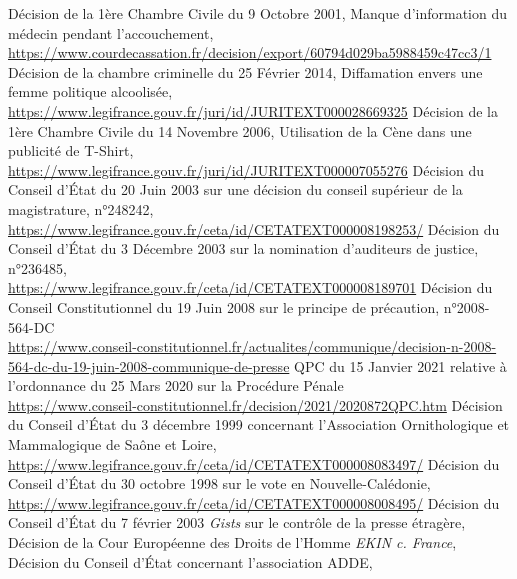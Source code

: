 \documentclass[math]{cours}
\begin{document}
\begin{thebibliography}{255}
	Décision de la 1ère Chambre Civile du 9 Octobre 2001, Manque d'information du médecin pendant l'accouchement,\\
	\url{https://www.courdecassation.fr/decision/export/60794d029ba5988459c47cc3/1}
	Décision de la chambre criminelle du 25 Février 2014, Diffamation envers une femme politique alcoolisée,\\
	\url{https://www.legifrance.gouv.fr/juri/id/JURITEXT000028669325}
	Décision de la 1ère Chambre Civile du 14 Novembre 2006, Utilisation de la Cène dans une publicité de T-Shirt,\\
	\url{https://www.legifrance.gouv.fr/juri/id/JURITEXT000007055276}
	Décision du Conseil d'État du 20 Juin 2003 sur une décision du conseil supérieur de la magistrature, n°248242,\\
	\url{https://www.legifrance.gouv.fr/ceta/id/CETATEXT000008198253/}
	Décision du Conseil d'État du 3 Décembre 2003 sur la nomination d'auditeurs de justice, n°236485,\\
	\url{https://www.legifrance.gouv.fr/ceta/id/CETATEXT000008189701}
	Décision du Conseil Constitutionnel du 19 Juin 2008 sur le principe de précaution, n°2008-564-DC\\
	\url{https://www.conseil-constitutionnel.fr/actualites/communique/decision-n-2008-564-dc-du-19-juin-2008-communique-de-presse}
	QPC du 15 Janvier 2021 relative à l'ordonnance du 25 Mars 2020 sur la Procédure Pénale\\
	\url{https://www.conseil-constitutionnel.fr/decision/2021/2020872QPC.htm}
	Décision du Conseil d'État du 3 décembre 1999 concernant l'Association Ornithologique et Mammalogique de Saône et Loire,\\
	\url{https://www.legifrance.gouv.fr/ceta/id/CETATEXT000008083497/}
	Décision du Conseil d'État du 30 octobre 1998 sur le vote en Nouvelle-Calédonie,\\
	\url{https://www.legifrance.gouv.fr/ceta/id/CETATEXT000008008495/}
	Décision du Conseil d'État du 7 février 2003 \textit{Gists} sur le contrôle de la presse étragère,\\
	\url{}
	Décision de la Cour Européenne des Droits de l'Homme \textit{EKIN c. France},\\
	\url{}
	Décision du Conseil d'État concernant l'association ADDE,\\

\end{thebibliography}
\end{document}

